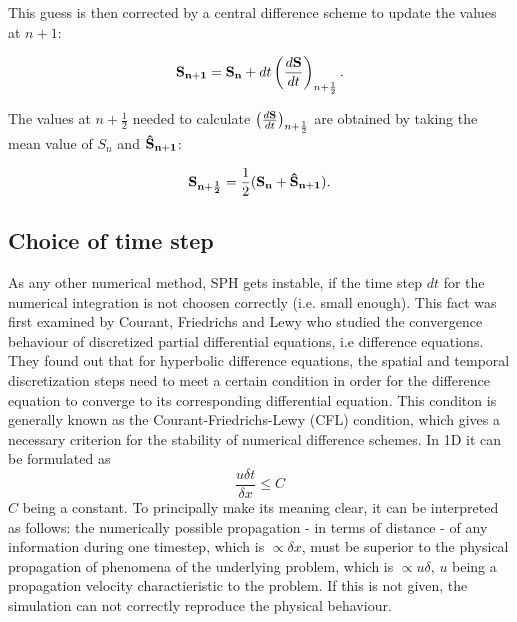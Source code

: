 \documentclass{report}
\begin{document}
This guess is then corrected by a central difference scheme to update the values at
$n+1$:

\begin{equation}
{\bf S_{n+1}}={\bf S_n}+dt\left(\frac{d{\bf S}}{dt}\right)_{n+\frac{1}{2}}.
\end{equation}

The values at $n+\frac{1}{2}$ needed to calculate
$\left(\frac{d{\bf S}}{dt}\right)_{n+\frac{1}{2}}$ are obtained by taking the mean value of
$S_n$ and ${\bf \hat S_{n+1}}$:

\begin{equation}
{\bf S_{n+\frac{1}{2}}}=\frac{1}{2}({\bf S_n}+{\bf \hat S_{n+1}}).
\end{equation}

\subsection{Choice of time step}
\label{sec:TmeStepChoice}
As any other numerical method, SPH gets instable, if the time step $dt$ for the numerical integration is not choosen correctly (i.e. small enough). 
This fact was first examined by Courant, Friedrichs and Lewy \cite{Courant1928} who studied the convergence behaviour of discretized partial differential equations, i.e difference equations. They found out that for hyperbolic difference equations, the spatial and temporal discretization steps need to meet a certain condition in order for the difference equation to converge to its  corresponding differential equation. This conditon is generally known as the Courant-Friedrichs-Lewy (CFL) condition, which gives a necessary criterion for the stability of numerical difference schemes.
In 1D it can be formulated as
\begin{equation}
 \frac{u\delta t}{\delta x}\leq C
\end{equation}
$C$ being a constant.
To principally make its meaning clear, it can be interpreted as follows:
the numerically possible propagation - in terms of distance - of any information during one timestep, which is $\propto\delta x$, must be superior to the physical propagation of phenomena of the underlying problem, which is $\propto u\delta$, $u$ being a propagation velocity charactieristic to the problem. If this is not given, the simulation can not correctly reproduce the physical behaviour. 
\end{document}
